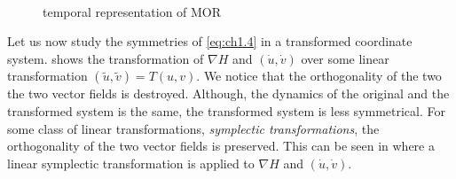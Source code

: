 \begin{figure} [t]
	\begin{centering}
	 \\
	\caption{temporal representation of MOR}
	\label{fig:ch1.2}
	\end{centering}
\end{figure}


Let us now study the symmetries of \eqref{eq:ch1.4} in a transformed coordinate system.  shows the transformation of $\nabla H$ and $(\dot u, \dot v)$ over some linear transformation $(\tilde u, \tilde v) = T(u,v)$. We notice that the orthogonality of the two the two vector fields is destroyed. Although, the dynamics of the original and the transformed system is the same, the transformed system is less symmetrical. For some class of linear transformations, \emph{symplectic transformations}, the orthogonality of the two vector fields is preserved. This can be seen in  where a linear symplectic transformation is applied to $\nabla H$ and $(\dot u, \dot v)$.

